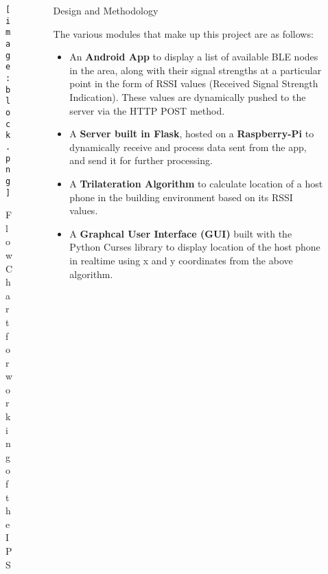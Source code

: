 \documentclass[final]{beamer}
\newlength{\sepwid}
\newlength{\onecolwid}
\newlength{\twocolwid}
\begin{document}
\begin{frame}[t]
\begin{columns}[t]
\begin{column}{\onecolwid}

\begin{figure}[h]
\texttt{[image: block.png]}
\caption{Flow Chart for working of the IPS}
\end{figure}


\end{column} %

\begin{column}{\sepwid}\end{column} %

\begin{column}{\twocolwid} %

\begin{columns}[t,totalwidth=\twocolwid] %

\begin{column}{\onecolwid}\vspace{-.6in} %


\begin{block}{Design and Methodology}

The various modules that make up this project are as follows: 

\begin{itemize}
\item An \textbf {Android App} to display a list of available BLE nodes in the area, along with their signal strengths at a particular point in the form of RSSI values (Received Signal Strength Indication). These values are dynamically pushed to the server via the HTTP POST method.
\item A \textbf {Server built in Flask}, hosted on a \textbf{Raspberry-Pi} to dynamically receive and process data sent from the app, and send it for further processing. 
\item A \textbf {Trilateration Algorithm} to calculate location of a host phone in the building environment based on its RSSI values.
\item A \textbf {Graphcal User Interface (GUI)} built with the Python Curses library to display location of the host phone in realtime using x and y coordinates from the above algorithm.
\end{itemize}


\end{block}
\end{column}
\end{columns}
\end{column}
\end{columns}
\end{frame}
\end{document}
